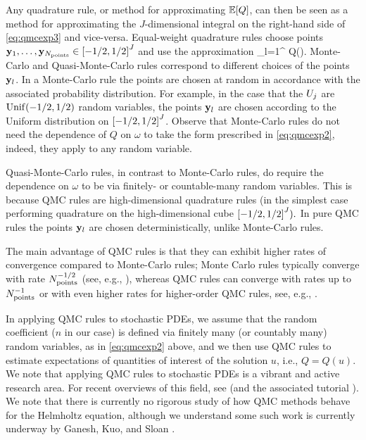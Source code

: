 Any quadrature rule, or method for approximating $\EXP{Q}$, can then be seen as a method for approximating the $J$-dimensional integral on the right-hand side of \cref{eq:qmcexp3} and vice-versa. Equal-weight quadrature rules choose points $\byo,\ldots,\byNpoints \in \cube{J}$ and use the approximation
\beqs
{} \approx {}\sum_{l=1}^{\Npoints} Q\mleft(\byl\mright).
\eeqs
Monte-Carlo and Quasi-Monte-Carlo rules correspond to different choices of the points $\mathbf{y}_{l}$. In a Monte-Carlo rule the points are chosen at random in accordance with the associated probability distribution. For example, in the case that the $U_{j}$ are $\mathrm{Unif}(-1/2,1/2)$ random variables, the points $\mathbf{y}_{l}$ are chosen according to the Uniform distribution on $\cube{J}$. Observe that Monte-Carlo rules do not need the dependence of $Q$ on $\omega$ to take the form prescribed in \cref{eq:qmcexp2}, indeed, they apply to any random variable.

Quasi-Monte-Carlo rules, in contrast to Monte-Carlo rules, do require the dependence on $\omega$ to be via finitely- or countable-many random variables. This is because QMC rules are high-dimensional quadrature rules (in the simplest case performing quadrature on the high-dim\-en\-sion\-al cube $\cube{J}).$ In pure QMC rules the points $\mathbf{y}_{l}$ are chosen deterministically, unlike Monte-Carlo rules.

The main advantage of QMC rules is that they can exhibit higher rates of convergence compared to Monte-Carlo rules; Monte Carlo rules typically converge with rate $N_{\mathrm{points}}^{-1/2}$ (see, e.g., \cite[Section 1.1]{Gi:15}), whereas QMC rules can converge with rates up to $N_{\mathrm{points}}^{-1}$  or with even higher rates for higher-order QMC rules, see, e.g., \cite[Penultimate paragraph of Section 1.2]{KuNu:16}.

In applying QMC rules to stochastic PDEs, we assume that the random coefficient ($n$ in our case) is defined via finitely many (or countably many) random variables, as in \cref{eq:qmcexp2} above, and we then use QMC rules to estimate expectations of quantities of interest of the solution $u$, i.e., $Q = Q(u).$ We note that applying QMC rules to stochastic PDEs is a vibrant and active research area. For recent overviews of this field, see \cite{KuNu:16,KuNu:18b} (and the associated tutorial \cite{KuNu:18a}). We note that there is currently no rigorous study of how QMC methods behave for the Helmholtz equation, although we understand some such work is currently underway by Ganesh, Kuo, and Sloan \cite{GaKuSl}.

